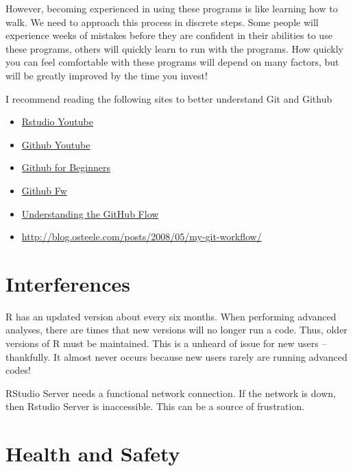 \documentclass[12pt]{../SOP4_alpha}
\begin{document}
\NP However, becoming experienced in using these programs is like learning how to walk. We need to approach this process in discrete steps. Some people will experience weeks of mistakes before they are confident in their abilities to use these programs, others will quickly learn to run with the programs. How quickly you can feel comfortable with these programs will depend on many factors, but will be greatly improved by the time you invest!

\NP I recommend reading the following sites to better understand Git and Github

\begin{itemize}
  \item \href{https://www.youtube.com/watch?v=uHYcDQDbMY8}{Rstudio Youtube}
  \item \href{https://www.youtube.com/watch?v=0fKg7e37bQE}{Github Youtube}
  \item \href{http://product.hubspot.com/blog/git-and-github-tutorial-for-beginners}{Github for Beginners}
  \item \href{http://scottchacon.com/2011/08/31/github-flow.html}{Github Fw}
  \item \href{https://guides.github.com/introduction/flow/}{Understanding the GitHub Flow}
  \item \href{http://blog.osteele.com/posts/2008/05/my-git-workflow/}{http://blog.osteele.com/posts/2008/05/my-git-workflow/}
  
\end{itemize}


\section{Interferences}

\NP R has an updated version about every six months. When performing advanced analyses, there are times that new versions will no longer run a code. Thus, older versions of R must be maintained. This is a unheard of issue for new users -- thankfully. It almost never occurs because new users rarely are running advanced codes!

\NP RStudio Server needs a functional network connection. If the network is down, then Rstudio Server is inaccessible. This can be a source of frustration. 

\section{Health and Safety}
\end{document}
